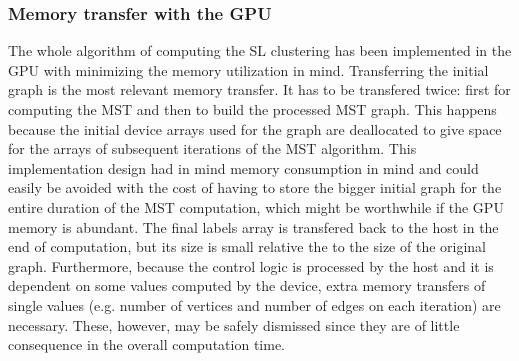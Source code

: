 \subsubsection{Memory transfer with the GPU}
The whole algorithm of computing the SL clustering has been implemented in the GPU with minimizing the memory utilization in mind.
Transferring the initial graph is the most relevant memory transfer.
It has to be transfered twice: first for computing the MST and then to build the processed MST graph.
This happens because the initial device arrays used for the graph are deallocated to give space for the arrays of subsequent iterations of the MST algorithm.
This implementation design had in mind memory consumption in mind and could easily be avoided with the cost of having to store the bigger initial graph for the entire duration of the MST computation, which might be worthwhile if the GPU memory is abundant.
The final labels array is transfered back to the host in the end of computation, but its size is small relative the to the size of the original graph.
Furthermore, because the control logic is processed by the host and it is dependent on some values computed by the device, extra memory transfers of single values (e.g. number of vertices and number of edges on each iteration) are necessary.
These, however, may be safely dismissed since they are of little consequence in the overall computation time.


